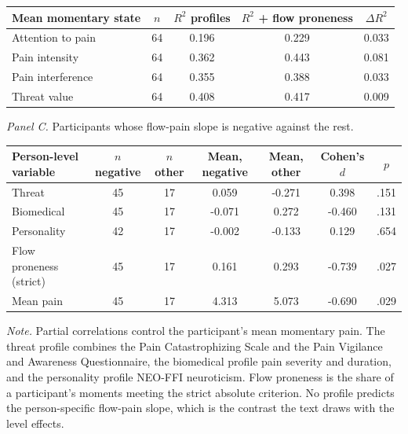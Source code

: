 \begin{table}[!htbp]
\begin{tabular*}{\textwidth}{@{\extracolsep{\fill}}lcccc@{}}
\toprule
Mean momentary state & $n$ & $R^2$ profiles & $R^2$ + flow proneness & $\Delta R^2$ \\
\midrule
Attention to pain & 64 & 0.196 & 0.229 & 0.033 \\
Pain intensity & 64 & 0.362 & 0.443 & 0.081 \\
Pain interference & 64 & 0.355 & 0.388 & 0.033 \\
Threat value & 64 & 0.408 & 0.417 & 0.009 \\
\bottomrule
\end{tabular*}
\par\vspace{6pt}\noindent\textit{Panel C.} Participants whose flow-pain slope is negative against the rest.\par\vspace{2pt}
\begin{tabular*}{\textwidth}{@{\extracolsep{\fill}}lcccccc@{}}
\toprule
Person-level variable & $n$ negative & $n$ other & Mean, negative & Mean, other & Cohen's $d$ & $p$ \\
\midrule
Threat & 45 & 17 & 0.059 & -0.271 & 0.398 & .151 \\
Biomedical & 45 & 17 & -0.071 & 0.272 & -0.460 & .131 \\
Personality & 42 & 17 & -0.002 & -0.133 & 0.129 & .654 \\
Flow proneness (strict) & 45 & 17 & 0.161 & 0.293 & -0.739 & .027 \\
Mean pain & 45 & 17 & 4.313 & 5.073 & -0.690 & .029 \\
\bottomrule
\end{tabular*}
\par\vspace{3pt}\noindent\parbox{\textwidth}{\footnotesize\textit{Note.} Partial correlations control the participant's mean momentary pain. The threat profile combines the Pain Catastrophizing Scale and the Pain Vigilance and Awareness Questionnaire, the biomedical profile pain severity and duration, and the personality profile NEO-FFI neuroticism. Flow proneness is the share of a participant's moments meeting the strict absolute criterion. No profile predicts the person-specific flow-pain slope, which is the contrast the text draws with the level effects.}
\endgroup
\end{table}
